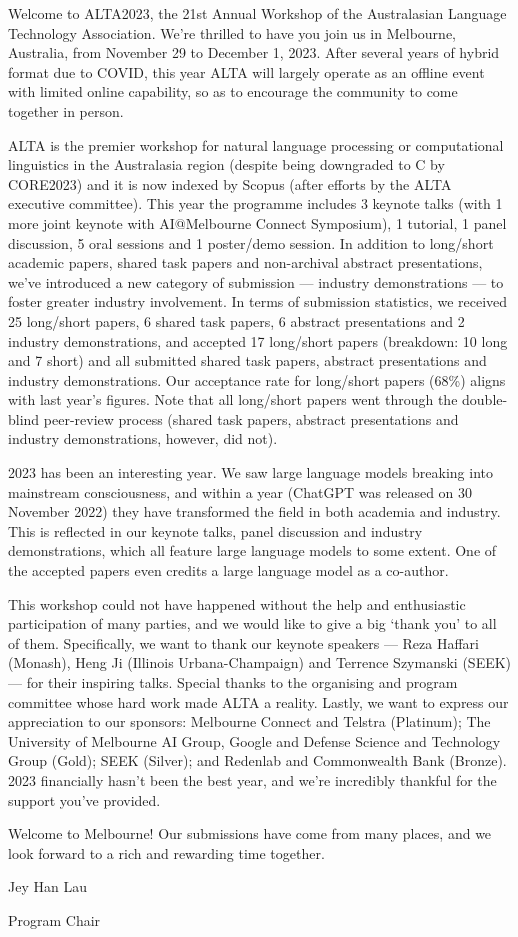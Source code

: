 Welcome to ALTA2023, the 21st Annual Workshop of the Australasian Language Technology Association. We're thrilled to have you join us in Melbourne, Australia, from November 29 to December 1, 2023. After several years of hybrid format due to COVID, this year ALTA will largely operate as an offline event with limited online capability, so as to encourage the community to come together in person.\newline

ALTA is the premier workshop for natural language processing or computational linguistics in the Australasia region (despite being downgraded to C by CORE2023) and it is now indexed by Scopus (after efforts by the ALTA executive committee). This year the programme includes 3 keynote talks (with 1 more joint keynote with AI@Melbourne Connect Symposium), 1 tutorial, 1 panel discussion, 5 oral sessions and 1 poster/demo session. In addition to long/short academic papers, shared task papers and non-archival abstract presentations, we've introduced a new category of submission --- industry demonstrations --- to foster greater industry involvement. In terms of submission statistics, we received 25 long/short papers, 6 shared task papers, 6 abstract presentations and 2 industry demonstrations, and accepted 17 long/short papers (breakdown: 10 long and 7 short) and all submitted shared task papers, abstract presentations and industry demonstrations. Our acceptance rate for long/short papers (68\%) aligns with last year's figures. Note that all long/short papers went through the double-blind peer-review process (shared task papers, abstract presentations and industry demonstrations, however, did not). \newline

2023 has been an interesting year. We saw large language models breaking into mainstream consciousness, and within a year (ChatGPT was released on 30 November 2022) they have transformed the field in both academia and industry. This is reflected in our keynote talks, panel discussion and industry demonstrations, which all feature large language models to some extent. One of the accepted papers even credits a large language model as a co-author.\newline

This workshop could not have happened without the help and enthusiastic participation of many parties, and we would like to give a big `thank you' to all of them. Specifically, we want to thank our keynote speakers --- Reza Haffari (Monash), Heng Ji (Illinois Urbana-Champaign) and Terrence Szymanski (SEEK) --- for their inspiring talks. Special thanks to the organising and program committee whose hard work made ALTA a reality. Lastly, we want to express our appreciation to our sponsors: Melbourne Connect and Telstra (Platinum); The University of Melbourne AI Group, Google and Defense Science and Technology Group (Gold); SEEK (Silver); and Redenlab and Commonwealth Bank (Bronze). 2023 financially hasn't been the best year, and we're incredibly thankful for the support you've provided.\newline

Welcome to Melbourne! Our submissions have come from many places, and we look forward to a rich and rewarding time together.\newline\newline\newline

Jey Han Lau\newline

Program Chair

